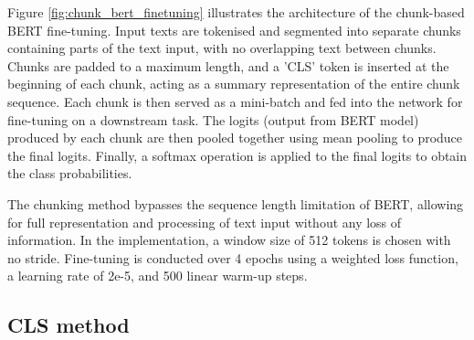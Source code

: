 Figure \ref{fig:chunk_bert_finetuning} illustrates the architecture of the chunk-based BERT fine-tuning. Input texts are tokenised and segmented into separate chunks containing parts of the text input, with no overlapping text between chunks. Chunks are padded to a maximum length, and a 'CLS' token is inserted at the beginning of each chunk, acting as a summary representation of the entire chunk sequence. Each chunk is then served as a mini-batch and fed into the network for fine-tuning on a downstream task. The logits (output from BERT model) produced by each chunk are then pooled together using mean pooling to produce the final logits. Finally, a softmax operation is applied to the final logits to obtain the class probabilities.

The chunking method bypasses the sequence length limitation of BERT, allowing for full representation and processing of text input without any loss of information. In the implementation, a window size of 512 tokens is chosen with no stride. Fine-tuning is conducted over 4 epochs using a weighted loss function, a learning rate of 2e-5, and 500 linear warm-up steps.

\subsection{CLS method}

